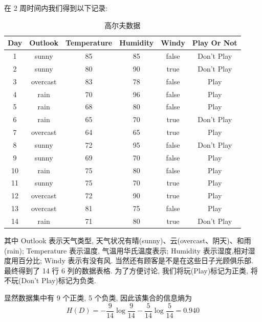\documentclass[a4paper,UTF8]{ctexart}
\theoremstyle{plain} \newtheorem{theorem}{定理}[section]
\theoremstyle{plain} \newtheorem{definition}{定义}[section]
\theoremstyle{plain} \newtheorem{lemma}{引理}[section]
\theoremstyle{plain} \newtheorem{proposition}{命题}[section]
\theoremstyle{plain} \newtheorem{example}{例}
\theoremstyle{plain} \newtheorem{remark}{注}
\theoremstyle{plain} \newtheorem{corollary}{推论}[section]
\begin{document}
在 2 周时间内我们得到以下记录:
\begin{table}[!htb]
\centering
\caption{高尔夫数据}
\label{golf}
\begin{tabular}{c|c|c|c|c|c}
  \hline
    \textbf{Day} & \textbf{Outlook} & \textbf{Temperature} & \textbf{Humidity} & \textbf{Windy} & \textbf{Play Or Not} \\
    \hline
    1 & sunny & 85 & 85 & false & Don't Play \\ 
    \hline
    2 & sunny & 80 & 90 & true  & Don't Play \\ 
    \hline
    3 & overcast & 83 & 78 & false & Play \\ 
    \hline 
    4 & rain & 70 & 96 & false & Play \\ 
    \hline
    5 & rain & 68 & 80 & false & Play \\ 
    \hline
    6 & rain & 65 & 70 & true &  Don't Play \\ 
    \hline
    7 & overcast & 64 & 65 & true & Play \\ 
    \hline
    8 & sunny & 72 & 95 & false & Don't Play \\ 
    \hline
    9 & sunny & 69 & 70 & false & Play \\ 
    \hline
    10 & rain & 75 & 80 & false & Play \\ 
    \hline
    11 & sunny & 75 & 70 & true & Play \\ 
    \hline
    12 & overcast & 72 & 90 & true & Play \\ 
    \hline
    13 & overcast & 81 & 75 & false & Play \\
    \hline
    14 & rain & 71 & 80 & true & Don't Play \\ 
  \hline
\end{tabular}
\end{table}

其中 Outlook 表示天气类型, 天气状况有晴(sunny)、云(overcast、阴天)、和雨(rain); Temperature 表示温度, 气温用华氏温度表示; Humidity 表示湿度,相对湿度用百分比; Windy 表示有没有风. 当然还有顾客是不是在这些日子光顾俱乐部. 最终得到了 14 行 6 列的数据表格. 为了方便讨论, 我们将玩(Play)标记为正类, 将不玩(Don't Play)标记为负类.

显然数据集中有 9 个正类, 5 个负类, 因此该集合的信息熵为
\begin{equation*}
H(D) = - \frac{9}{14} \log \frac{9}{14} - \frac{5}{14} \log \frac{5}{14} = 0.940
\end{equation*}
\end{document}
